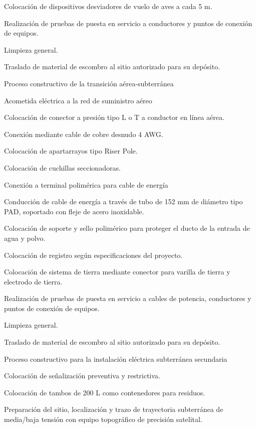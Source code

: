 \documentclass{article}
\begin{document}
Colocación de dispositivos desviadores de vuelo de aves a cada 5 m.

Realización de pruebas de puesta en servicio a conductores y puntos de conexión de equipos.

Limpieza general.

Traslado de material de escombro al sitio autorizado para su depósito.


\bigskip


\bigskip

Proceso constructivo de la transición aérea-subterránea


\bigskip

Acometida eléctrica a la red de suministro aéreo

Colocación de conector a presión tipo L o T a conductor en línea aérea.

Conexión mediante cable de cobre desnudo 4 AWG.

Colocación de apartarrayos tipo Riser Pole.

Colocación de cuchillas seccionadoras.

Conexión a terminal polimérica para cable de energía

Conducción de cable de energía a través de tubo de 152 mm de diámetro tipo PAD, soportado con fleje de acero inoxidable.

Colocación de soporte y sello polimérico para proteger el ducto de la entrada de agua y polvo.

Colocación de registro según especificaciones del proyecto.

Colocación de sistema de tierra mediante conector para varilla de tierra y electrodo de tierra.

Realización de pruebas de puesta en servicio a cables de potencia, conductores y puntos de conexión de equipos.

Limpieza general.

Traslado de material de escombro al sitio autorizado para su depósito.


\bigskip


\bigskip

Proceso constructivo para la instalación eléctrica subterránea secundaria


\bigskip

Colocación de señalización preventiva y restrictiva.

Colocación de tambos de 200 L como contenedores para residuos.

Preparación del sitio, localización y trazo de trayectoria subterránea de media/baja tensión con equipo topográfico de precisión satelital.
\end{document}
